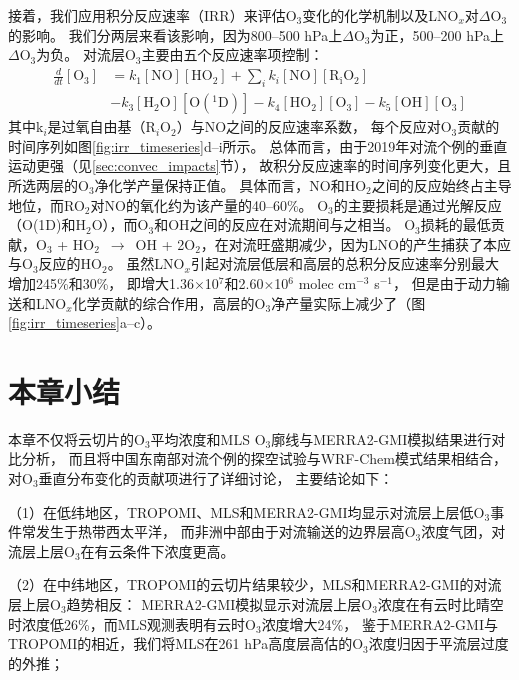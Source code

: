 接着，我们应用积分反应速率（IRR）来评估O$_3$变化的化学机制以及LNO$_x$对$\Delta$O$_3$的影响。
我们分两层来看该影响，因为800--500 hPa上$\Delta$O$_3$为正，500--200 hPa上$\Delta$O$_3$为负。
对流层O$_3$主要由五个反应速率项控制\citep{Pickering.1990}：
{\abovedisplayskip=3pt%
\belowdisplayskip=3pt%
\begin{align}
  \frac{d}{dt}[\mathrm{O_3}] &= k_1[\mathrm{NO}][\mathrm{HO_2}] + \sum_{i}  k_i[\mathrm{NO}][\mathrm{R_iO_2}] \nonumber \\
                             & - k_3[\mathrm{H_2O}][\mathrm{O(^1D)}] - k_4[\mathrm{HO_2}][\mathrm{O_3}] - k_5[\mathrm{OH}][\mathrm{O_3}]
\end{align}
}
其中k$_i$是过氧自由基（R$_i$O$_2$）与NO之间的反应速率系数，
每个反应对O$_3$贡献的时间序列如图\ref{fig:irr_timeseries}d--i所示。
总体而言，由于2019年对流个例的垂直运动更强（见\ref{sec:convec_impacts}节），
故积分反应速率的时间序列变化更大，且所选两层的O$_3$净化学产量保持正值。
具体而言，NO和HO$_2$之间的反应始终占主导地位，而RO$_2$对NO的氧化约为该产量的40--60\%。
O$_3$的主要损耗是通过光解反应（O(1D)和H$_2$O），而O$_3$和OH之间的反应在对流期间与之相当。
O$_3$损耗的最低贡献，O$_3$ + HO$_2$ $\,\to\,$ OH + 2O$_2$，在对流旺盛期减少，因为LNO的产生捕获了本应与O$_3$反应的HO$_2$。
虽然LNO$_x$引起对流层低层和高层的总积分反应速率分别最大增加245\%和30\%，
即增大1.36$\times$10$^7$和2.60$\times$10$^6$ molec cm$^{-3}$ s$^{-1}$，
但是由于动力输送和LNO$_x$化学贡献的综合作用，高层的O$_3$净产量实际上减少了（图\ref{fig:irr_timeseries}a--c）。


\section{本章小结}

本章不仅将云切片的O$_3$平均浓度和MLS O$_3$廓线与MERRA2-GMI模拟结果进行对比分析，
而且将中国东南部对流个例的探空试验与WRF-Chem模式结果相结合，对O$_3$垂直分布变化的贡献项进行了详细讨论，
主要结论如下：

（1）在低纬地区，TROPOMI、MLS和MERRA2-GMI均显示对流层上层低O$_3$事件常发生于热带西太平洋，
而非洲中部由于对流输送的边界层高O$_3$浓度气团，对流层上层O$_3$在有云条件下浓度更高。

（2）在中纬地区，TROPOMI的云切片结果较少，MLS和MERRA2-GMI的对流层上层O$_3$趋势相反：
MERRA2-GMI模拟显示对流层上层O$_3$浓度在有云时比晴空时浓度低26\%，而MLS观测表明有云时O$_3$浓度增大24\%，
鉴于MERRA2-GMI与TROPOMI的相近，我们将MLS在261 hPa高度层高估的O$_3$浓度归因于平流层过度的外推；


